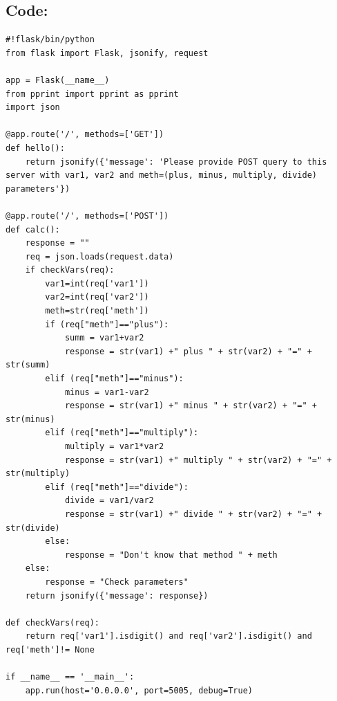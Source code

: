 \documentclass[10pt]{article}
\begin{document}
\subsection{Code:}
\begin{verbatim}
#!flask/bin/python
from flask import Flask, jsonify, request

app = Flask(__name__)
from pprint import pprint as pprint
import json

@app.route('/', methods=['GET'])
def hello():
    return jsonify({'message': 'Please provide POST query to this server with var1, var2 and meth=(plus, minus, multiply, divide) parameters'})

@app.route('/', methods=['POST'])
def calc():
    response = ""
    req = json.loads(request.data)
    if checkVars(req):
        var1=int(req['var1'])
        var2=int(req['var2'])
        meth=str(req['meth'])
        if (req["meth"]=="plus"):
            summ = var1+var2
            response = str(var1) +" plus " + str(var2) + "=" + str(summ)
        elif (req["meth"]=="minus"):
            minus = var1-var2
            response = str(var1) +" minus " + str(var2) + "=" + str(minus)
        elif (req["meth"]=="multiply"):
            multiply = var1*var2
            response = str(var1) +" multiply " + str(var2) + "=" + str(multiply)
        elif (req["meth"]=="divide"):
            divide = var1/var2
            response = str(var1) +" divide " + str(var2) + "=" + str(divide)
        else:
            response = "Don't know that method " + meth
    else:
        response = "Check parameters"
    return jsonify({'message': response})

def checkVars(req):
    return req['var1'].isdigit() and req['var2'].isdigit() and req['meth']!= None

if __name__ == '__main__':
    app.run(host='0.0.0.0', port=5005, debug=True)
\end{verbatim}
\end{document}
